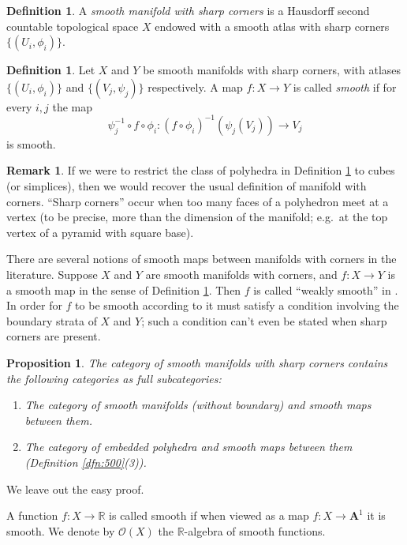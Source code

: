 \documentclass[10pt, a4paper]{amsart}
\newtheorem{prop}[equation]{Proposition}
\theoremstyle{definition}
\newtheorem{dfn}[equation]{Definition}
\newtheorem{rem}[equation]{Remark}
\numberwithin{equation}{section}
\newcommand{\mcal}[1]{\mathcal{#1}}
\newcommand{\mbf}[1]{\mathbf{#1}}
\newcommand{\mbb}[1]{\mathbb{#1}}
\newcommand{\tup}[1]{\textup{#1}}
\newcommand{\R}{\mbb{R}}
\begin{document}
\begin{dfn} \label{dfn:505}
A {\em smooth manifold with sharp corners}
is a  Hausdorff second countable
topological space $X$ endowed with a smooth atlas with sharp corners
$\{ (U_i, \phi_i) \}$.
\end{dfn}

\begin{dfn} \label{dfn:506}
Let $X$ and $Y$ be smooth manifolds with sharp corners,
with atlases  $\{ (U_i, \phi_i) \}$ and $\{ (V_j, \psi_j) \}$ respectively. A
map $f : X \to Y$ is called {\em smooth} if for every $i,j$ the map 
\[ \psi_j^{-1} \circ f \circ \phi_i : 
(f \circ \phi_i)^{-1} (\psi_j(V_j)) \to V_j \]
is smooth. 
\end{dfn}

\begin{rem} \label{rem:506}
If we were to restrict the class of polyhedra in Definition \ref{dfn:505} to
cubes (or simplices), then we would recover the usual definition of manifold
with corners.  ``Sharp corners'' occur when too many faces of a polyhedron meet
at a vertex (to
be precise, more than the dimension of the manifold; e.g.\ at the top vertex of
a pyramid with square base). 

There are several notions of smooth maps between manifolds with corners in the
literature. Suppose $X$ and $Y$ are smooth manifolds with corners, and 
$f : X \to Y$ is a smooth map in the sense of Definition
\ref{dfn:506}. Then $f$ is called ``weakly smooth'' in \cite{Jo}. In order for
$f$ to be smooth according to \cite{Jo} it must satisfy a condition involving
the boundary strata of $X$ and $Y$; such a condition can't even be stated
when sharp corners are present.
\end{rem}

\begin{prop} \label{prop:500}
The category of smooth manifolds with sharp corners contains the following
categories as full subcategories:
\begin{enumerate}
\item The category of smooth manifolds (without boundary) and smooth maps
between them.
\item The category of embedded polyhedra and smooth maps
between them (Definition \tup{\ref{dfn:500}(3)}).
\end{enumerate}
\end{prop}

We leave out the easy proof. 

A function $f : X \to \R$ is called smooth if when viewed as a map 
$f : X \to \mbf{A}^1$ it is smooth. We denote by $\mcal{O}(X)$ the $\R$-algebra
of smooth functions.
\end{document}
